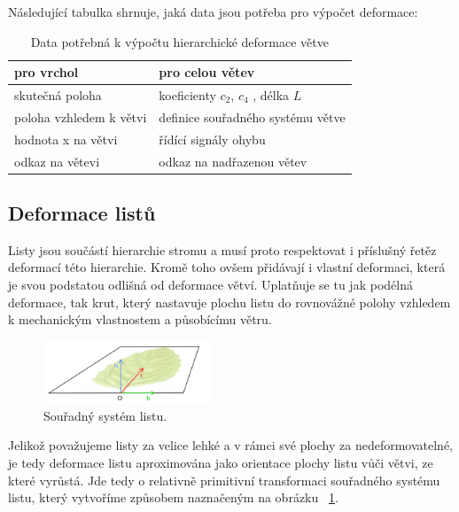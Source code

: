 Následující tabulka shrnuje, jaká data jsou potřeba pro výpočet deformace:

\begin{table}[here]
\centering
\begin{tabular}{| l | l | }
  \hline                       
  pro vrchol & pro celou větev  \\
\hline   
  skutečná poloha & koeficienty $c_2$,  $c_4$ , délka  $L$  \\
  poloha vzhledem k větvi & definice souřadného systému větve \\
hodnota x na větvi & řídící signály ohybu \\
odkaz na větevi & odkaz na nadřazenou větev \\
  \hline  
\end{tabular}
\caption{Data potřebná k výpočtu hierarchické deformace větve}
\end{table}


\subsection{Deformace listů}
Listy jsou součástí hierarchie stromu a musí proto respektovat i příslušný řetěz deformací této hierarchie. Kromě toho ovšem přidávají i vlastní deformaci, která je svou podstatou odlišná od deformace větví. Uplatňuje se tu jak podélná deformace, tak krut, který nastavuje plochu listu do rovnovážné polohy vzhledem k mechanickým vlastnostem a působícímu větru. 
\begin{figure}[here]
\begin{center}
\includegraphics[width=0.45\textwidth]{./figures/leafCoordSystem2.png}
\end{center}
\caption[Souřadný systém listu]%
{ Souřadný systém listu.
\label{fig:bendLeaf}
}

\end{figure}
Jelikož považujeme listy za velice lehké a v rámci své plochy za nedeformovatelné, je tedy deformace listu aproximována jako orientace plochy listu vůči větvi, ze které vyrůstá. Jde tedy o relativně primitivní transformaci souřadného systému listu, který vytvoříme způsobem naznačeným na obrázku ~\ref{fig:bendLeaf}.


